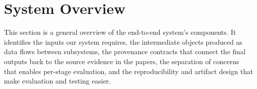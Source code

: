 \section{System Overview}\label{section:system_overview}

\makeatletter
{}
\makeatother

This section is a general overview of the end-to-end system's components. It identifies the inputs our system requires, the intermediate objects produced as data flows between subsystems, the provenance contracts that connect the final outputs back to the source evidence in the papers, the separation of concerns that enables per-stage evaluation, and the reproducibility and artifact design that make evaluation and testing easier.






% 